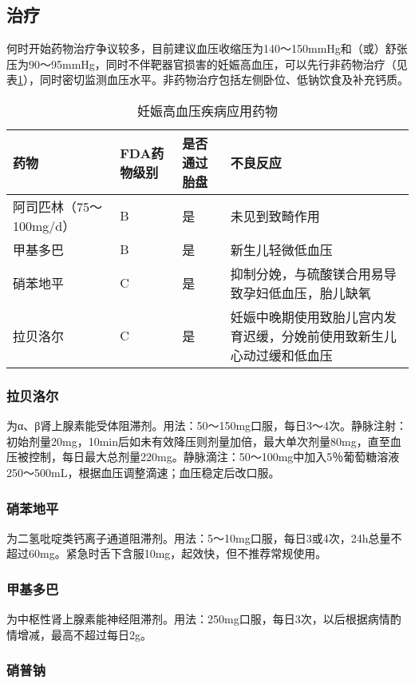 \subsection{治疗}

何时开始药物治疗争议较多，目前建议血压收缩压为140～150mmHg和（或）舒张压为90～95mmHg，同时不伴靶器官损害的妊娠高血压，可以先行非药物治疗（见表\ref{tab22-1}），同时密切监测血压水平。非药物治疗包括左侧卧位、低钠饮食及补充钙质。

\begin{longtable}[]{p{4cm}llp{6cm}}
    \caption{妊娠高血压疾病应用药物}
    \label{tab22-1}\\
\toprule
药物 & FDA药物级别 & 是否通过胎盘 & 不良反应\tabularnewline
\midrule
\endhead
阿司匹林（75～100mg/d） & B & 是 & 未见到致畸作用\tabularnewline
甲基多巴 & B & 是 & 新生儿轻微低血压\tabularnewline
硝苯地平 & C & 是 &
抑制分娩，与硫酸镁合用易导致孕妇低血压，胎儿缺氧\tabularnewline
拉贝洛尔 & C & 是 &
妊娠中晚期使用致胎儿宫内发育迟缓，分娩前使用致新生儿心动过缓和低血压\tabularnewline
\bottomrule
\end{longtable}

\subsubsection{拉贝洛尔}

为α、β肾上腺素能受体阻滞剂。用法：50～150mg口服，每日3～4次。静脉注射：初始剂量20mg，10min后如未有效降压则剂量加倍，最大单次剂量80mg，直至血压被控制，每日最大总剂量220mg。静脉滴注：50～100mg中加入5％葡萄糖溶液250～500mL，根据血压调整滴速；血压稳定后改口服。

\subsubsection{硝苯地平}

为二氢吡啶类钙离子通道阻滞剂。用法：5～10mg口服，每日3或4次，24h总量不超过60mg。紧急时舌下含服10mg，起效快，但不推荐常规使用。

\subsubsection{甲基多巴}

为中枢性肾上腺素能神经阻滞剂。用法：250mg口服，每日3次，以后根据病情酌情增减，最高不超过每日2g。

\subsubsection{硝普钠}

